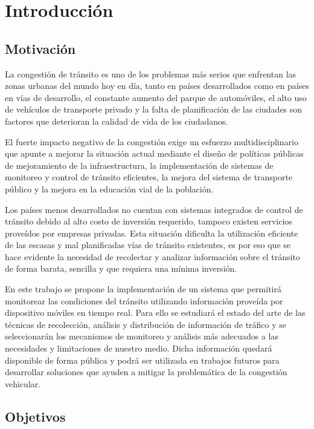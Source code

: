 \chapter{Introducción}

\section{Motivación}

La congestión de tránsito es uno de los problemas más serios que enfrentan las zonas urbanas del mundo hoy en día, tanto en países desarrollados como en países en vías de desarrollo, el constante aumento del parque de automóviles, el alto uso de vehículos de transporte privado y la falta de planificación de las ciudades son factores que deterioran la calidad de vida de los ciudadanos.

El fuerte impacto negativo de la congestión exige un esfuerzo multidisciplinario que apunte a mejorar la situación actual mediante el diseño de políticas públicas de mejoramiento de la infraestructura, la implementación de sistemas de monitoreo y control de tránsito eficientes, la mejora del sistema de transporte público y la mejora en la educación vial de la población.

Los países menos desarrollados no cuentan con sistemas integrados de control de tránsito debido al alto costo de inversión requerido, tampoco existen servicios proveídos por empresas privadas. Esta situación dificulta la utilización eficiente de las escasas y mal planificadas vías de tránsito existentes, es por eso que se hace evidente la necesidad de recolectar y analizar información sobre el tránsito de forma barata, sencilla y que requiera una mínima inversión.

En este trabajo se propone la implementación de un sistema que permitirá monitorear las condiciones del tránsito utilizando información proveída por dispositivo móviles en tiempo real. Para ello se estudiará el estado del arte de las técnicas de recolección, análisis y distribución de información de tráfico y se seleccionarán los mecanismos de monitoreo y análisis más adecuados a las necesidades y limitaciones de nuestro medio. Dicha información quedará disponible de forma pública y podrá ser utilizada en trabajos futuros para desarrollar soluciones que ayuden a mitigar la problemática de la congestión vehicular.

\section{Objetivos}


